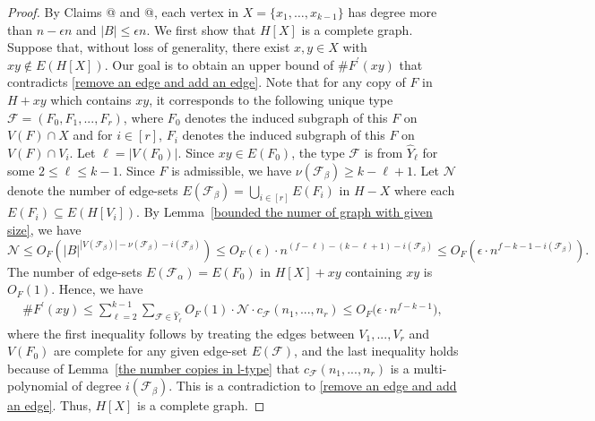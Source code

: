 \documentclass[10pt]{article}
\makeatletter
\newcommand*{\rom}[1]{\expandafter\@slowromancap\romannumeral #1@}
\makeatother
\begin{document}
\begin{proof}
By Claims \rom{1} and \rom{2}, each vertex in $X=\{x_1,\ldots,x_{k-1}\}$ has degree more than $n-\epsilon n$ and $|B|\leq \epsilon n$.
We first show that $H[X]$ is a complete graph.
Suppose that, without loss of generality, there exist $x,y\in X$ with $xy\notin E(H[X])$.
Our goal is to obtain an upper bound of $\#F^\prime(xy)$ that contradicts \eqref{remove an edge and add an edge}.
Note that for any copy of $F$ in $H+xy$ which contains $xy$,
it corresponds to the following unique type $\mathcal{F}=(F_0,F_1,...,F_r)$, where $F_0$ denotes the induced subgraph of this $F$ on $V(F)\cap X$ and for $i\in [r]$,
$F_i$ denotes the induced subgraph of this $F$ on $V(F)\cap V_i$.
Let $\ell=|V(F_0)|$.
Since $xy\in E(F_0)$, the type $\mathcal{F}$ is from $\widehat{Y}_\ell$ for some $2\leq \ell\leq k-1$.
Since $F$ is admissible, we have $\nu(\mathcal{F}_\beta)\geq k-\ell+1$.
Let $\mathcal{N}$ denote the number of edge-sets $E(\mathcal{F}_\beta)=\bigcup_{i\in [r]} E(F_i)$ in $H-X$ where each $E(F_i)\subseteq E(H[V_i])$.
By Lemma~\ref{bounded the numer of graph with given size}, we have
$$\mathcal{N}\leq O_F(|B|^{|V(\mathcal{F}_\beta)|-\nu(\mathcal{F}_\beta)-i(\mathcal{F}_\beta)})\leq O_F(\epsilon)\cdot n^{(f-\ell)-(k-\ell+1)-i(\mathcal{F}_\beta)}\leq O_F\left(\epsilon\cdot n^{f-k-1-i(\mathcal{F}_\beta)}\right).$$
The number of edge-sets $E(\mathcal{F}_\alpha)=E(F_0)$ in $H[X]+xy$ containing $xy$ is $O_F(1)$.
Hence, we have
\begin{align*}
\#F^\prime(xy)\leq \sum_{\ell=2}^{k-1} \sum_{\mathcal{F}\in \widehat{Y}_\ell} O_F(1)\cdot \mathcal{N} \cdot c_{\mathcal{F}}(n_1,...,n_r)\leq O_F\big(\epsilon\cdot n^{f-k-1}\big),
\end{align*}
where the first inequality follows by treating the edges between $V_1,...,V_r$ and $V(F_0)$ are complete for any given edge-set $E(\mathcal{F})$,
and the last inequality holds because of Lemma~\ref{the number copies in l-type} that $c_{\mathcal{F}}(n_1,...,n_r)$ is a multi-polynomial of degree $i(\mathcal{F}_\beta)$. This is a contradiction to \eqref{remove an edge and add an edge}.
Thus, $H[X]$ is a complete graph.


\end{proof}
\end{document}
